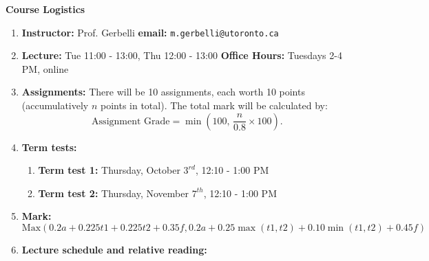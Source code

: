\begin{center}
    \vspace*{0.5cm} %
    {\Huge \textbf{Course Logistics}} %
    \vspace{0.4cm} %
\end{center}

\begin{enumerate}
    \item \textbf{Instructor:} Prof. Gerbelli \qquad \textbf{email:} \texttt{m.gerbelli@utoronto.ca}
    
    \item \textbf{Lecture:} Tue 11:00 - 13:00, Thu 12:00 - 13:00 \qquad \textbf{Office Hours:} Tuesdays 2-4 PM, online
    
    \item \textbf{Assignments:} There will be 10 assignments, each worth 10 points (accumulatively \(n\) points in total).
    The total mark will be calculated by: 
    \[
    \text{Assignment Grade} = \min\left(100,\, \frac{n}{0.8} \times 100\right).
    \]
    
    \item \textbf{Term tests:}
    \begin{enumerate}
        \item \textbf{Term test 1:} Thursday, October $3^{rd}$, 12:10 - 1:00 PM
        \item \textbf{Term test 2:} Thursday, November $7^{th}$, 12:10 - 1:00 PM
    \end{enumerate}
    
    \item \textbf{Mark:} 
    \[
    \text{Max}\left(0.2a + 0.225t1 + 0.225t2 + 0.35f, 0.2a + 0.25 \max(t1, t2) + 0.10 \min(t1, t2) + 0.45f\right)
    \]
    
    \item \textbf{Lecture schedule and relative reading:}
\end{enumerate}


